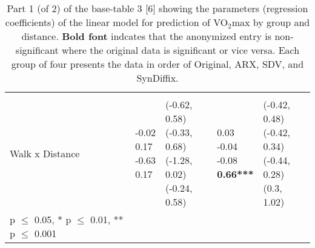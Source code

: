 \documentclass[10pt]{article}
\newcommand{\mycite}[1]{[#1]}
\begin{document}
\begin{table}
\begin{center}
\begin{small}
\begin{tabular}{lllll}
& & & & \\ 
\quad Walk x Distance    &  \makecell[l]{\textnormal{-0.02\phantom{***}} \\\textnormal{0.17\phantom{***}} \\\textnormal{-0.63\phantom{***}} \\\textnormal{0.17\phantom{***}} \\}   &  \makecell[l]{\textnormal{(-0.62, 0.58)} \\\textnormal{(-0.33, 0.68)} \\\textnormal{(-1.28, 0.02)} \\\textnormal{(-0.24, 0.58)} \\}   &  \makecell[l]{\textnormal{0.03\phantom{***}} \\\textnormal{-0.04\phantom{***}} \\\textnormal{-0.08\phantom{***}} \\\textbf{0.66***} \\}   &  \makecell[l]{\textnormal{(-0.42, 0.48)} \\\textnormal{(-0.42, 0.34)} \\\textnormal{(-0.44, 0.28)} \\\textnormal{(0.3, 1.02)} \\} \\ 

      \bottomrule
      {\footnotesize * p $\leq$ 0.05, \quad** p $\leq$ 0.01, \quad*** p $\leq$ 0.001}
      \end{tabular}
      \end{small}
      \caption{Part 1 (of 2) of the base-table 3 \mycite{6} showing the parameters (regression coefficients) of the linear model for prediction of VO$_2$max by group and distance. \textbf{Bold font} indcates that the anonymized entry is non-significant where the original data is significant or vice versa. Each group of four presents the data in order of Original, ARX, SDV, and SynDiffix. 
      }
      \label{tab:table3a}
      \end{center}
      \end{table}
      \setlength{\fboxsep}{3pt}
    
\end{document}
